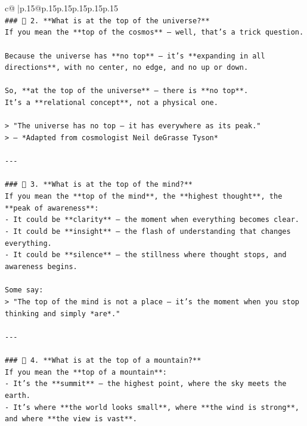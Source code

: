 \documentclass{article}
\begin{document}
{\begin{supertabular}{c@{$\;$}|p{.15\linewidth}@{}p{.15\linewidth}p{.15\linewidth}p{.15\linewidth}p{.15\linewidth}p{.15\linewidth}}
{{{\\ 
\texttt{\#\#\# 🌌 2. **What is at the top of the universe?**} \\
\texttt{If you mean the **top of the cosmos** — well, that’s a trick question.} \\
\\ 
\texttt{Because the universe has **no top** — it’s **expanding in all directions**, with no center, no edge, and no up or down.} \\
\\ 
\texttt{So, **at the top of the universe** — there is **no top**.  } \\
\texttt{It’s a **relational concept**, not a physical one.} \\
\\ 
\texttt{> "The universe has no top — it has everywhere as its peak."  } \\
\texttt{> — *Adapted from cosmologist Neil deGrasse Tyson*} \\
\\ 
\texttt{{-}{-}{-}} \\
\\ 
\texttt{\#\#\# 🧠 3. **What is at the top of the mind?**} \\
\texttt{If you mean the **top of the mind**, the **highest thought**, the **peak of awareness**:} \\
\texttt{{-} It could be **clarity** — the moment when everything becomes clear.} \\
\texttt{{-} It could be **insight** — the flash of understanding that changes everything.} \\
\texttt{{-} It could be **silence** — the stillness where thought stops, and awareness begins.} \\
\\ 
\texttt{Some say:} \\
\texttt{> "The top of the mind is not a place — it’s the moment when you stop thinking and simply *are*."} \\
\\ 
\texttt{{-}{-}{-}} \\
\\ 
\texttt{\#\#\# 🌄 4. **What is at the top of a mountain?**} \\
\texttt{If you mean the **top of a mountain**:} \\
\texttt{{-} It’s the **summit** — the highest point, where the sky meets the earth.} \\
\texttt{{-} It’s where **the world looks small**, where **the wind is strong**, and where **the view is vast**.} \\
}}}
\end{supertabular}}
\end{document}
